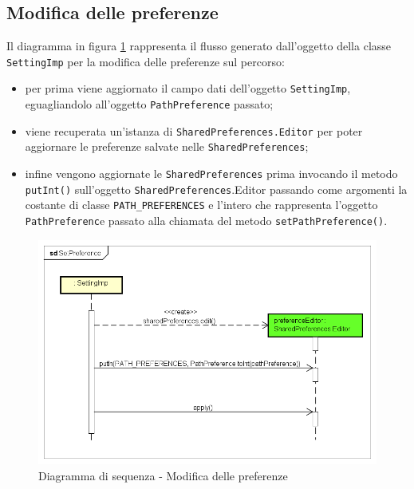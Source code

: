 \documentclass[../DefinizioneDiProdotto.tex]{subfiles}
\begin{document}
	\newpage
	\subsection{Modifica delle preferenze}
	
		Il diagramma in figura \ref{fig:SetPreference} rappresenta il flusso generato dall'oggetto della classe \verb|SettingImp| per la modifica delle preferenze sul percorso:
		\begin{itemize}
			\item per prima viene aggiornato il campo dati dell'oggetto \verb|SettingImp|, eguagliandolo all'oggetto \verb|PathPreference| passato;
			\item viene recuperata un'istanza di \verb|SharedPreferences.Editor| per poter aggiornare le preferenze salvate nelle \verb|SharedPreferences|;
			\item infine vengono aggiornate le \verb|SharedPreferences| prima invocando il metodo \verb|putInt()| sull'oggetto \verb|SharedPreferences|.Editor passando come argomenti la costante di classe \verb|PATH_PREFERENCES| e l'intero che rappresenta l'oggetto \verb|PathPreferenc|e passato alla chiamata del metodo \verb|setPathPreference()|.
		\end{itemize}
		
		\begin{figure} [h]
			\includegraphics[width=\textwidth]{diagrams/SetPreference}
			\caption{Diagramma di sequenza - Modifica delle preferenze}
			\label{fig:SetPreference}
		\end{figure}
		
\end{document}
